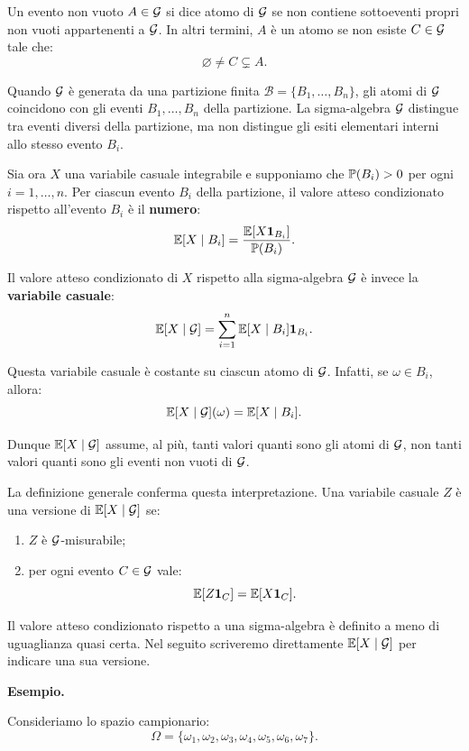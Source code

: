 Un evento non vuoto $A\in\mathcal{G}$ si dice atomo di $\mathcal{G}$ se non
contiene sottoeventi propri non vuoti appartenenti a $\mathcal{G}$. In altri
termini, $A$ \`{e} un atomo se non esiste $C\in\mathcal{G}$ tale che:
\[
\varnothing\neq C\subsetneq A.
\]

Quando $\mathcal{G}$ \`{e} generata da una partizione finita
$\mathcal{B}=\{B_1,\ldots,B_n\}$, gli atomi di $\mathcal{G}$ coincidono con gli
eventi $B_1,\ldots,B_n$ della partizione. La sigma-algebra $\mathcal{G}$
distingue tra eventi diversi della partizione, ma non distingue gli esiti
elementari interni allo stesso evento $B_i$.

Sia ora $X$ una variabile casuale integrabile e supponiamo che
$\mathbb{P}(B_i)>0$ per ogni $i=1,\ldots,n$. Per ciascun evento $B_i$ della
partizione, il valore atteso condizionato rispetto all'evento $B_i$ \`{e} il
\textbf{numero}:
\[
\mathbb{E}[X\mid B_i]
=
\frac{\mathbb{E}[X\mathbf{1}_{B_i}]}{\mathbb{P}(B_i)}.
\]

Il valore atteso condizionato di $X$ rispetto alla sigma-algebra
$\mathcal{G}$ \`{e} invece la \textbf{variabile casuale}:
\[
\mathbb{E}[X\mid\mathcal{G}]
=
\sum_{i=1}^{n}
\mathbb{E}[X\mid B_i]\mathbf{1}_{B_i}.
\]

Questa variabile casuale \`{e} costante su ciascun atomo di $\mathcal{G}$.
Infatti, se $\omega\in B_i$, allora:
\[
\mathbb{E}[X\mid\mathcal{G}](\omega)
=
\mathbb{E}[X\mid B_i].
\]

Dunque $\mathbb{E}[X\mid\mathcal{G}]$ assume, al pi\`{u}, tanti valori quanti
sono gli atomi di $\mathcal{G}$, non tanti valori quanti sono gli eventi non
vuoti di $\mathcal{G}$.

La definizione generale conferma questa interpretazione. Una variabile
casuale $Z$ \`{e} una versione di $\mathbb{E}[X\mid\mathcal{G}]$ se:
\begin{enumerate}
    \item $Z$ \`{e} $\mathcal{G}$-misurabile;

    \item per ogni evento $C\in\mathcal{G}$ vale:
    \[
    \mathbb{E}[Z\mathbf{1}_C]
    =
    \mathbb{E}[X\mathbf{1}_C].
    \]
\end{enumerate}

Il valore atteso condizionato rispetto a una sigma-algebra \`{e} definito a
meno di uguaglianza quasi certa. Nel seguito scriveremo direttamente
$\mathbb{E}[X\mid\mathcal{G}]$ per indicare una sua versione.

\medskip

\noindent
\textbf{Esempio.}

Consideriamo lo spazio campionario:
\[
\Omega
=
\{\omega_1,\omega_2,\omega_3,\omega_4,\omega_5,\omega_6,\omega_7\}.
\]


